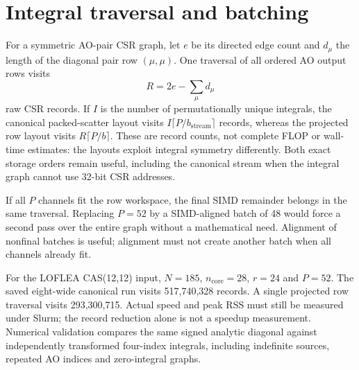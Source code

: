 \documentclass[11pt,a4paper]{article}
\begin{document}
\section{Integral traversal and batching}

For a symmetric AO-pair CSR graph, let $e$ be its directed edge count and
$d_\mu$ the length of the diagonal pair row $(\mu,\mu)$. One traversal of
all ordered AO output rows visits
\begin{equation}
 R=2e-\sum_\mu d_\mu
\end{equation}
raw CSR records. If $I$ is the number of permutationally unique integrals,
the canonical packed-scatter layout visits
$I\lceil P/b_{\mathrm{stream}}\rceil$ records, whereas the projected row
layout visits $R\lceil P/b\rceil$. These are record counts, not complete
FLOP or wall-time estimates: the layouts exploit integral symmetry differently.
Both exact storage orders remain useful, including the canonical stream when
the integral graph cannot use 32-bit CSR addresses.

If all $P$ channels fit the row workspace, the final SIMD remainder belongs
in the same traversal. Replacing $P=52$ by a SIMD-aligned batch of 48 would
force a second pass over the entire graph without a mathematical need.
Alignment of nonfinal batches is useful; alignment must not create another
batch when all channels already fit.

For the LOFLEA CAS(12,12) input, $N=185$, $n_{\mathrm{core}}=28$, $r=24$
and $P=52$. The saved eight-wide canonical run visits 517,740,328 records.
A single projected row traversal visits 293,300,715. Actual speed and peak
RSS must still be measured under Slurm; the record reduction alone is not
a speedup measurement. Numerical validation compares the same signed
analytic diagonal against independently transformed four-index integrals,
including indefinite sources, repeated AO indices and zero-integral graphs.
\end{document}
